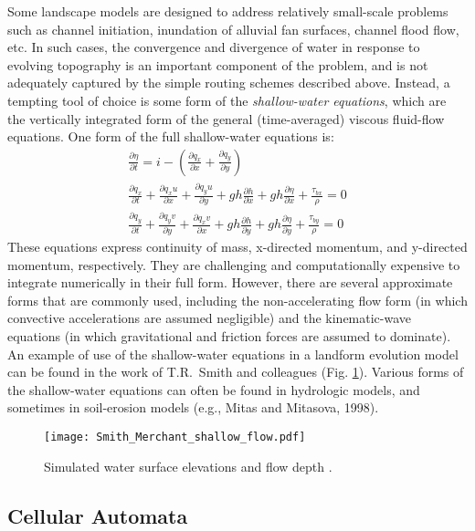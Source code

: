 \documentclass[12pt,reqno]{amsart}
\begin{document}
Some landscape models are designed to address relatively small-scale problems such as channel initiation, inundation of alluvial fan surfaces, channel flood flow, etc. In such cases, the convergence and divergence of water in response to evolving topography is an important component of the problem, and is not adequately captured by the simple routing schemes described above. Instead, a tempting tool of choice is some form of the {\em shallow-water equations}, which are the vertically integrated form of the general (time-averaged) viscous fluid-flow equations. One form of the full shallow-water equations is:
\begin{eqnarray}
\frac{\partial \eta}{\partial t} = i - \left( \frac{\partial q_x}{\partial x}
+ \frac{\partial q_y}{\partial y} \right ) \\
\frac{\partial q_x}{\partial t} + \frac{\partial q_x u}{\partial x}
+ \frac{\partial q_y u}{\partial y}
+ g h \frac{\partial h}{\partial x}
+ g h \frac{\partial \eta}{\partial x}
+ \frac{\tau_{bx}}{\rho} = 0 \\
\frac{\partial q_y}{\partial t} + \frac{\partial q_y v}{\partial y}
+ \frac{\partial q_x v}{\partial x}
+ g h \frac{\partial h}{\partial y}
+ g h \frac{\partial \eta}{\partial y}
+ \frac{\tau_{by}}{\rho} = 0
\end{eqnarray}
These equations express continuity of mass, x-directed momentum, and y-directed momentum, respectively. They are challenging and computationally expensive to integrate numerically in their full form. However, there are several approximate forms that are commonly used, including the non-accelerating flow form (in which convective accelerations are assumed negligible) and the kinematic-wave equations (in which gravitational and friction forces are assumed to dominate). An example of use of the shallow-water equations in a landform evolution model can be found in the work of T.R.\ Smith and colleagues (Fig. \ref{fig:shalflow}). Various forms of the shallow-water equations can often be found in hydrologic models, and sometimes in soil-erosion models (e.g., Mitas and Mitasova, 1998\nocite{mitas1998distributed}).

\begin{figure}
\centering
\texttt{[image: Smith\_Merchant\_shallow\_flow.pdf]}
\captionsetup{width=4.8in}
\caption{Simulated water surface elevations and flow depth \citep{birnir2001}.}
\label{fig:shalflow}
\end{figure}

\subsection{Cellular Automata}
\end{document}
